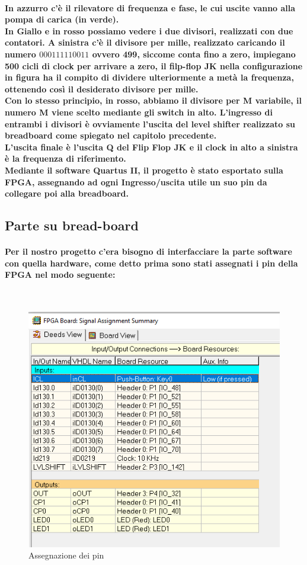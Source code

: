 \documentclass{article}
\begin{document}
\paragraph{In azzurro c'è il rilevatore di frequenza e fase, le cui uscite vanno alla pompa di carica (in verde).\\In Giallo e in rosso possiamo vedere i due divisori, realizzati con due contatori.
A sinistra c'è il divisore per mille, realizzato caricando il numero $000111110011$ ovvero 499, siccome conta fino a zero, impiegano 500 cicli di clock per arrivare a zero, il filp-flop JK nella configurazione in figura ha il compito di dividere ulteriormente a metà la frequenza, ottenendo così il desiderato divisore per mille.\\
Con lo stesso principio, in rosso, abbiamo il divisore per M variabile, il numero M viene scelto mediante gli switch in alto.
L'ingresso di entrambi i divisori è ovviamente l'uscita del level shifter realizzato su breadboard come spiegato nel capitolo precedente.\\L'uscita finale è l'uscita Q del Flip Flop JK e il clock in alto a sinistra è la frequenza di riferimento.\\Mediante il software Quartus II, il progetto è stato esportato sulla FPGA, assegnando ad ogni Ingresso/uscita utile un suo pin da collegare poi alla breadboard.}
 \subsection{Parte su bread-board}
 \paragraph{Per il nostro progetto c'era bisogno di interfacciare la parte software con quella hardware, come detto prima sono stati assegnati i pin della FPGA nel modo seguente:}
 ~\begin{figure}[!h]%
\includegraphics[scale=0.6]{PinDeeds.png} 
\centering
\caption{Assegnazione dei pin}
\label{fig:foo}
\end{figure}
\end{document}
